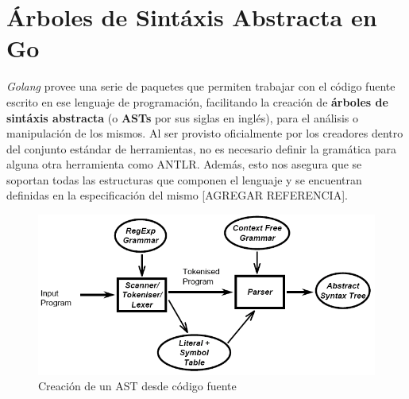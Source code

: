 \section{Árboles de Sintáxis Abstracta en Go}

\textit{Golang} provee una serie de paquetes que permiten trabajar con el código fuente escrito en ese 
lenguaje de programación, facilitando la creación de \textbf{árboles de sintáxis abstracta}
(o \textbf{ASTs} por sus siglas en inglés), para el análisis o manipulación de los mismos.
Al ser provisto oficialmente por los creadores dentro del conjunto estándar de herramientas, 
no es necesario definir la gramática para alguna otra herramienta como ANTLR.
Además, esto nos asegura que se soportan todas las estructuras que componen el lenguaje 
y se encuentran definidas en la especificación del mismo [AGREGAR REFERENCIA].

\begin{figure}[H]
  \includegraphics[width=12cm]{implementation/parsingpipeline}
  \centering
  \caption{Creación de un AST desde código fuente}
\end{figure}

